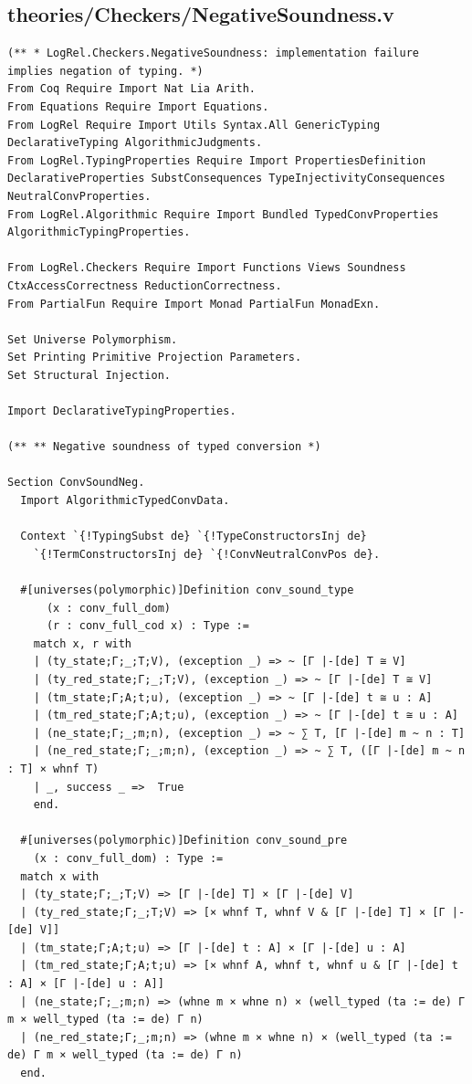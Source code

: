\documentclass[10pt,a4paper]{amsart}
\begin{document}
\subsection*{theories/Checkers/NegativeSoundness.v}
\begin{lstlisting}
(** * LogRel.Checkers.NegativeSoundness: implementation failure implies negation of typing. *)
From Coq Require Import Nat Lia Arith.
From Equations Require Import Equations.
From LogRel Require Import Utils Syntax.All GenericTyping DeclarativeTyping AlgorithmicJudgments.
From LogRel.TypingProperties Require Import PropertiesDefinition DeclarativeProperties SubstConsequences TypeInjectivityConsequences NeutralConvProperties.
From LogRel.Algorithmic Require Import Bundled TypedConvProperties AlgorithmicTypingProperties.

From LogRel.Checkers Require Import Functions Views Soundness CtxAccessCorrectness ReductionCorrectness.
From PartialFun Require Import Monad PartialFun MonadExn.

Set Universe Polymorphism.
Set Printing Primitive Projection Parameters.
Set Structural Injection.

Import DeclarativeTypingProperties.

(** ** Negative soundness of typed conversion *)

Section ConvSoundNeg.
  Import AlgorithmicTypedConvData.

  Context `{!TypingSubst de} `{!TypeConstructorsInj de}
    `{!TermConstructorsInj de} `{!ConvNeutralConvPos de}.

  #[universes(polymorphic)]Definition conv_sound_type
      (x : conv_full_dom)
      (r : conv_full_cod x) : Type :=
    match x, r with
    | (ty_state;Γ;_;T;V), (exception _) => ~ [Γ |-[de] T ≅ V]
    | (ty_red_state;Γ;_;T;V), (exception _) => ~ [Γ |-[de] T ≅ V]
    | (tm_state;Γ;A;t;u), (exception _) => ~ [Γ |-[de] t ≅ u : A]
    | (tm_red_state;Γ;A;t;u), (exception _) => ~ [Γ |-[de] t ≅ u : A]
    | (ne_state;Γ;_;m;n), (exception _) => ~ ∑ T, [Γ |-[de] m ~ n : T]
    | (ne_red_state;Γ;_;m;n), (exception _) => ~ ∑ T, ([Γ |-[de] m ~ n : T] × whnf T)
    | _, success _ =>  True
    end.

  #[universes(polymorphic)]Definition conv_sound_pre
    (x : conv_full_dom) : Type :=
  match x with
  | (ty_state;Γ;_;T;V) => [Γ |-[de] T] × [Γ |-[de] V]
  | (ty_red_state;Γ;_;T;V) => [× whnf T, whnf V & [Γ |-[de] T] × [Γ |-[de] V]]
  | (tm_state;Γ;A;t;u) => [Γ |-[de] t : A] × [Γ |-[de] u : A]
  | (tm_red_state;Γ;A;t;u) => [× whnf A, whnf t, whnf u & [Γ |-[de] t : A] × [Γ |-[de] u : A]]
  | (ne_state;Γ;_;m;n) => (whne m × whne n) × (well_typed (ta := de) Γ m × well_typed (ta := de) Γ n)
  | (ne_red_state;Γ;_;m;n) => (whne m × whne n) × (well_typed (ta := de) Γ m × well_typed (ta := de) Γ n)
  end.



\end{lstlisting}
\end{document}
